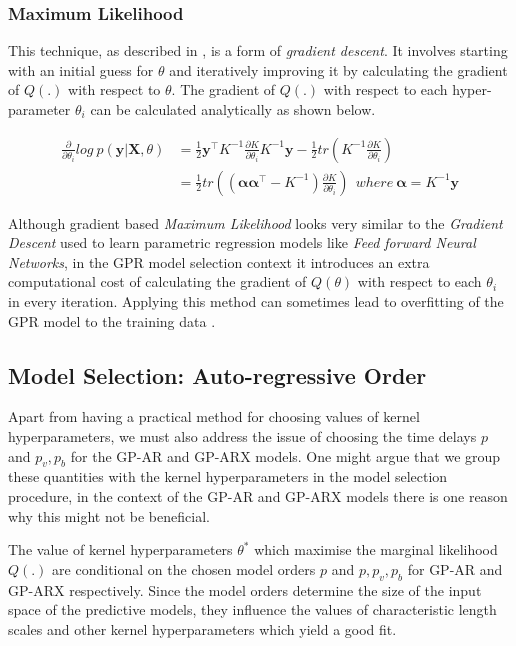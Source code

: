 \documentclass{article}
\begin{document}
\subsubsection*{Maximum Likelihood} 

This technique, as described in \citet{Rasmussen:2005:GPM:1162254}, is
a form of \emph{gradient descent}. It involves starting with an
initial guess for $\theta$ and iteratively improving it by calculating
the gradient of $Q(.)$ with respect to $\theta$. The gradient of
$Q(.)$ with respect to each hyper-parameter $\theta_i$ can be
calculated analytically as shown below.

\begin{align*}
  \frac{\partial}{\partial \theta_i} log \ p(\mathbf{y}|\mathbf{X}, \theta) & = \frac{1}{2} \mathbf{y}^\intercal K^{-1} \frac{\partial K}{\partial \theta_i} K^{-1} \mathbf{y}  - \frac{1}{2} tr(K^{-1} \frac{\partial K}{\partial \theta_i})\\
                                                                            & = \frac{1}{2} tr((\mathbf{\alpha}\mathbf{\alpha}^\intercal - K^{-1}) \frac{\partial K}{\partial \theta_i}) \ \ where \ \mathbf{\alpha} = K^{-1} \mathbf{y}
\end{align*}


Although gradient based \emph{Maximum Likelihood} looks very similar
to the \emph{Gradient Descent} used to learn parametric regression
models like \emph{Feed forward Neural Networks}, in the GPR model
selection context it introduces an extra computational cost of
calculating the gradient of $Q(\theta)$ with respect to each
$\theta_i$ in every iteration. Applying this method can sometimes lead
to overfitting of the GPR model to the training data \citep{Rasmussen:2005:GPM:1162254}.

\subsection{Model Selection: Auto-regressive Order}

Apart from having a practical method for choosing values of kernel
hyperparameters, we must also address the issue of choosing the time
delays $p$ and $p_v, p_b$ for the GP-AR and GP-ARX models. One might
argue that we group these quantities with the kernel hyperparameters
in the model selection procedure, in the context of the GP-AR and
GP-ARX models there is one reason why this might not be beneficial. 

The value of kernel hyperparameters $\theta^*$ which maximise the
marginal likelihood $Q(.)$ are conditional on the chosen model orders
$p$ and $p, p_v, p_b$ for GP-AR and GP-ARX respectively. Since the
model orders determine the size of the input space of the predictive
models, they influence the values of characteristic length scales and
other kernel hyperparameters which yield a good fit.
\end{document}
